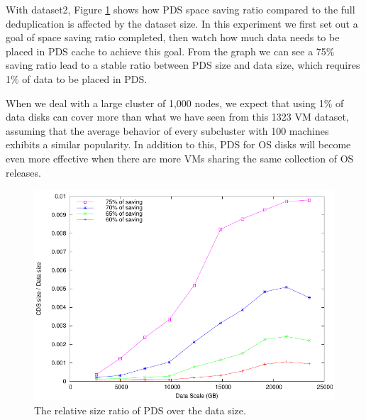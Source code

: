 With dataset2, Figure \ref{fig:datacds} shows how PDS space saving ratio
compared to the full deduplication is affected by the dataset size.
In this experiment we first set out a goal of space saving ratio completed,
then watch how much data needs to be placed in PDS cache to achieve this goal.
From the graph we can see a 75\% saving ratio lead to a stable ratio between
PDS size and data size, which requires 1\% of data to be placed in PDS.

When we deal with a large cluster of 1,000 nodes, we expect that using
1\% of data disks can cover more than what we have seen from this
1323 VM dataset, assuming that the average behavior of every subcluster with 100 machines
exhibits a similar popularity.
In addition to this, PDS for OS disks will become even more effective when
there are more VMs sharing the same collection of OS releases. 

\begin{figure}
  \centering
  \includegraphics[width=5in]{images/cds_scale_07.pdf}
  \caption{The relative size ratio of  PDS over the data size. }
  \label{fig:datacds}
\end{figure}

